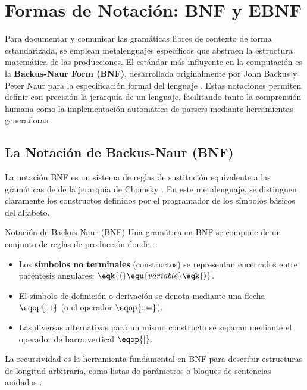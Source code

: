 \section{Formas de Notación: BNF y EBNF}
\label{sec:3_3_notacion_bnf}

Para documentar y comunicar las gramáticas libres de contexto de forma estandarizada, se emplean metalenguajes específicos que abstraen la estructura matemática de las producciones. El estándar más influyente en la computación es la \textbf{Backus-Naur Form (BNF)}, desarrollada originalmente por John Backus y Peter Naur para la especificación formal del lenguaje  \cite{aho2006compilers,sipser2012introduction}. Estas notaciones permiten definir con precisión la jerarquía de un lenguaje, facilitando tanto la comprensión humana como la implementación automática de parsers mediante herramientas generadoras \cite{aho2006compilers}.

\subsection{La Notación de Backus-Naur (BNF)}
\label{subsec:3_3_1_bnf}

La notación BNF es un sistema de reglas de sustitución equivalente a las gramáticas de  de la jerarquía de Chomsky \cite{sipser2012introduction}. En este metalenguaje, se distinguen claramente los constructos definidos por el programador de los símbolos básicos del alfabeto.

\begin{definicion}{Notación de Backus-Naur (BNF)}
Una gramática en BNF se compone de un conjunto de reglas de producción donde \cite{aho2006compilers,sipser2012introduction}:
\begin{itemize}
    \item Los \textbf{símbolos no terminales} (constructos) se representan encerrados entre paréntesis angulares: $\eqk{\langle} \equ{variable} \eqk{\rangle}$.
    \item El símbolo de definición o derivación se denota mediante una flecha $\eqop{\rightarrow}$ (o el operador $\eqop{::=}$).
    \item Las diversas alternativas para un mismo constructo se separan mediante el operador de barra vertical $\eqop{\mid}$.
\end{itemize}
\end{definicion}

La recursividad es la herramienta fundamental en BNF para describir estructuras de longitud arbitraria, como listas de parámetros o bloques de sentencias anidados \cite{aho2006compilers}.

